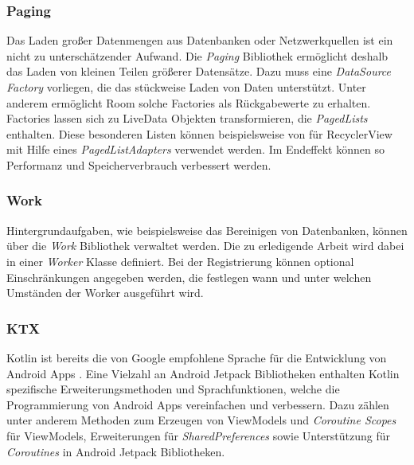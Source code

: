 \documentclass[a4paper, 11pt]{article}
\begin{document}
\subsubsection{Paging}
\label{subsubsec:app:jetpack:paging}
Das Laden großer Datenmengen aus Datenbanken oder Netzwerkquellen ist ein nicht zu unterschätzender Aufwand.
Die \textit{Paging} Bibliothek ermöglicht deshalb das Laden von kleinen Teilen größerer Datensätze.
Dazu muss eine \textit{DataSource Factory} vorliegen, die das stückweise Laden von Daten unterstützt.
Unter anderem ermöglicht Room solche Factories als Rückgabewerte zu erhalten.
Factories lassen sich zu LiveData Objekten transformieren, die \textit{PagedLists} enthalten.
Diese besonderen Listen können beispielsweise von für RecyclerView mit Hilfe eines \textit{PagedListAdapters} verwendet werden.
Im Endeffekt können so Performanz und Speicherverbrauch verbessert werden.

\subsubsection{Work}
\label{subsubsec:app:jetpack:work}
Hintergrundaufgaben, wie beispielsweise das Bereinigen von Datenbanken, können über die \textit{Work} Bibliothek verwaltet werden.
Die zu erledigende Arbeit wird dabei in einer \textit{Worker} Klasse definiert.
Bei der Registrierung können optional Einschränkungen angegeben werden, die festlegen wann und unter welchen Umständen der Worker ausgeführt wird.

\subsubsection{KTX}
\label{subsubsec:app:jetpack:extensions}
Kotlin ist bereits die von Google empfohlene Sprache für die Entwicklung von Android Apps \autocite{androidkotlin}.
Eine Vielzahl an Android Jetpack Bibliotheken enthalten Kotlin spezifische Erweiterungsmethoden und Sprachfunktionen, welche die Programmierung von Android Apps vereinfachen und verbessern.
Dazu zählen unter anderem Methoden zum Erzeugen von ViewModels und \textit{Coroutine Scopes} für ViewModels, Erweiterungen für \textit{SharedPreferences} sowie Unterstützung für \textit{Coroutines} in Android Jetpack Bibliotheken.
\end{document}
